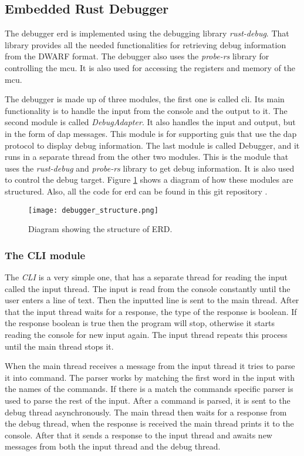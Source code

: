 \subsection{Embedded Rust Debugger}
The debugger \acrfull{erd} is implemented using the debugging library \emph{rust-debug}.
That library provides all the needed functionalities for retrieving debug information from the \gls{DWARF} format.
The debugger also uses the \emph{probe-rs} library for controlling the \gls{mcu}.
It is also used for accessing the registers and memory of the \gls{mcu}.


The debugger is made up of three modules, the first one is called \acrshort{cli}.
Its main functionality is to handle the input from the console and the output to it.
The second module is called \emph{DebugAdapter}.
It also handles the input and output, but in the form of \gls{dap} messages.
This module is for supporting \glspl{gui} that use the \gls{dap} protocol to display debug information.
The last module is called Debugger, and it runs in a separate thread from the other two modules.
This is the module that uses the \emph{rust-debug} and \emph{probe-rs} library to get debug information.
It is also used to control the debug target.
Figure \ref{fig:ERDStruct} shows a diagram of how these modules are structured.
Also, all the code for \gls{erd} can be found in this git repository \cite{erd}.


\begin{figure}[h]
	\centering
	\texttt{[image: debugger\_structure.png]}
	\caption{Diagram showing the structure of ERD.}
	\label{fig:ERDStruct}
\end{figure}


\subsubsection{The CLI module}
The \emph{CLI} is a very simple one, that has a separate thread for reading the input called the input thread.
The input is read from the console constantly until the user enters a line of text.
Then the inputted line is sent to the main thread.
After that the input thread waits for a response, the type of the response is boolean.
If the response boolean is true then the program will stop, otherwise it starts reading the console for new input again.
The input thread repeats this process until the main thread stops it.


When the main thread receives a message from the input thread it tries to parse it into command.
The parser works by matching the first word in the input with the names of the commands.
If there is a match the commands specific parser is used to parse the rest of the input.
After a command is parsed, it is sent to the debug thread asynchronously.
The main thread then waits for a response from the debug thread, when the response is received the main thread prints it to the console.
After that it sends a response to the input thread and awaits new messages from both the input thread and the debug thread.


